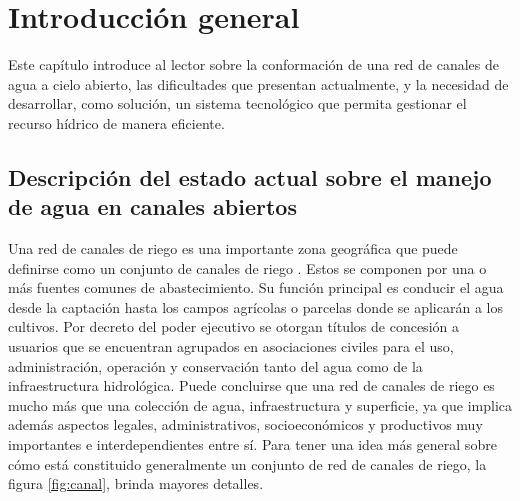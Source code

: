 
\chapter{Introducción general} %

\label{Chapter1} %
\label{IntroGeneral}

Este capítulo introduce al lector sobre la conformación de una red de canales de agua a cielo abierto, las dificultades que presentan actualmente, y la necesidad de desarrollar, como solución, un sistema tecnológico que permita gestionar el recurso hídrico de manera eficiente. 

\newcommand{\keyword}[1]{\textbf{#1}}
\newcommand{\tabhead}[1]{\textbf{#1}}
\newcommand{\code}[1]{\texttt{#1}}
\newcommand{\file}[1]{\texttt{\bfseries#1}}
\newcommand{\option}[1]{\texttt{\itshape#1}}
\newcommand{\grados}{$^{\circ}$}



\section{Descripción del estado actual sobre el manejo de agua en canales abiertos}

Una red de canales de riego es una importante zona geográfica que puede definirse como un conjunto de canales de riego \citep{CANALDERIEGO}. Estos se componen por una o más fuentes comunes de abastecimiento. Su función principal es conducir el agua desde la captación hasta los
campos agrícolas o parcelas donde se aplicarán a los cultivos. Por decreto del poder ejecutivo se otorgan títulos de concesión a usuarios que se encuentran agrupados en asociaciones civiles para el uso, administración, operación y conservación tanto del agua como de la infraestructura hidrológica.
Puede concluirse que una red de canales de riego es mucho más que una colección de agua, infraestructura y superficie, ya que implica además aspectos legales, administrativos, socioeconómicos y productivos muy importantes e interdependientes entre sí.
Para tener una idea más general sobre cómo está constituido generalmente un conjunto de red de canales de riego, la figura \ref{fig:canal}, brinda mayores detalles.

